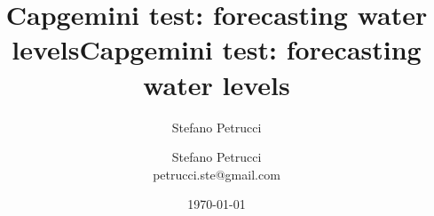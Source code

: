 \documentclass[aspectratio=169, glossy]{beamer}
\title{Capgemini test: forecasting water levels}
\author{Stefano Petrucci}
\institute{}
\date{\today}
\begin{document}

\begin{frame}[plain]
\title{\LARGE{\textcolor{MyBlue}{Capgemini test: forecasting water levels}}}
\author{
	Stefano Petrucci\\
	\footnotesize{petrucci.ste@gmail.com}
}
\date{}
\titlepage
\end{frame}



\end{document}
